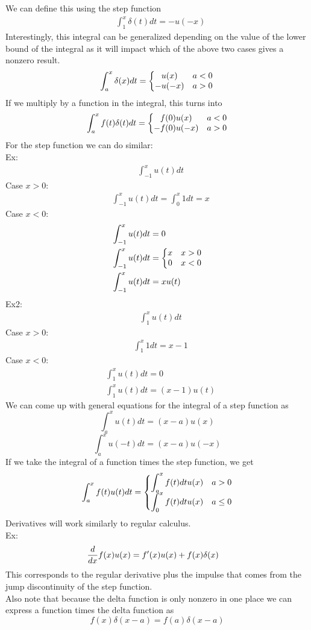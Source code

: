 \documentclass[11pt, fleqn]{article}
\begin{document}
We can define this using the step function
\begin{align*}
    &\int_1^x\delta(t)dt=-u(-x)
\end{align*}
Interestingly, this integral can be generalized depending on the value of the lower bound of the integral as it will impact which of the above two cases gives a nonzero result.
$$\int_a^x\delta(x)dt=\left\{\begin{matrix} u(x) & a<0\\ -u(-x) & a>0 \end{matrix}\right.$$
If we multiply by a function in the integral, this turns into
$$\int_a^xf(t)\delta(t)dt=\left\{\begin{matrix} f(0)u(x) & a<0\\ -f(0)u(-x) & a>0 \end{matrix}\right.$$
For the step function we can do similar:\\
Ex:
\begin{align*}
    &\int_{-1}^xu(t)dt
\end{align*}
Case $x>0$:
\begin{align*}
    &\int_{-1}^xu(t)dt=\int_0^x1dt=x
\end{align*}
Case $x<0$:
\begin{align*}
    &\int_{-1}^xu(t)dt=0\\
    &\int_{-1}^xu(t)dt=\left\{\begin{matrix} x & x>0\\ 0 & x<0 \end{matrix}\right.\\
    &\int_{-1}^xu(t)dt=xu(t)
\end{align*}
Ex2:
\begin{align*}
    &\int_1^xu(t)dt
\end{align*}
Case $x>0$:
\begin{align*}
    &\int_1^x 1dt=x-1
\end{align*}
Case $x<0$:
\begin{align*}
    &\int_1^x u(t)dt=0\\
    &\int_1^xu(t)dt=(x-1)u(t)
\end{align*}
We can come up with general equations for the integral of a step function as
$$\int_a^x u(t)dt=(x-a)u(x)$$
$$\int_a^x u(-t)dt=(x-a)u(-x)$$
If we take the integral of a function times the step function, we get
$$\int_a^xf(t)u(t)dt=\left\{\begin{matrix} \displaystyle\int_a^xf(t)dtu(x) & a>0\\ \displaystyle\int_0^xf(t)dtu(x) & a\leq0 \end{matrix}\right.$$
Derivatives will work similarly to regular calculus.\\
Ex:
\begin{align*}
    &\frac{d }{d x}f(x)u(x)=f'(x)u(x)+f(x)\delta(x)
\end{align*}
This corresponds to the regular derivative plus the impulse that comes from the jump discontinuity of the step function.\\
Also note that because the delta function is only nonzero in one place we can express a function times the delta function as
$$f(x)\delta(x-a)=f(a)\delta(x-a)$$
\end{document}
